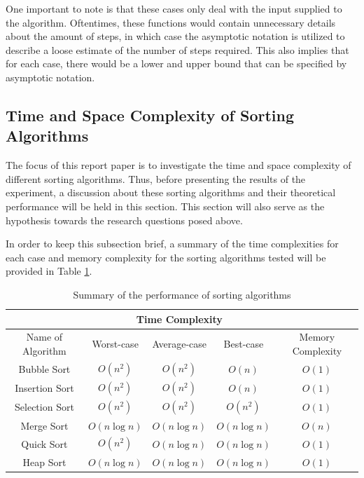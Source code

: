 \documentclass{report}
\begin{document}
One important to note is that these cases only deal with the input supplied to the algorithm. Oftentimes, these functions would contain unnecessary details about the amount of steps, in which case the asymptotic notation is utilized to describe a loose estimate of the number of steps required. This also implies that for each case, there would be a lower and upper bound that can be specified by asymptotic notation.

\subsection{Time and Space Complexity of Sorting Algorithms}
The focus of this report paper is to investigate the time and space complexity of different sorting algorithms. Thus, before presenting the results of the experiment, a discussion about these sorting algorithms and their theoretical performance will be held in this section. This section will also serve as the hypothesis towards the research questions posed above.

In order to keep this subsection brief, a summary of the time complexities for each case and memory complexity for the sorting algorithms tested will be provided in Table \ref{sumSort}.
\begin{table}[h]
	\centering
	\begin{tabular}{@{}ccccc@{}}
		\toprule
		\multicolumn{1}{|c}{\cellcolor[HTML]{000000}} & \multicolumn{3}{c|}{Time Complexity}          & \multicolumn{1}{c|}{\cellcolor[HTML]{000000}} \\ \midrule
		\multicolumn{1}{c|}{Name of Algorithm}        & Worst-case    & Average-case  & Best-case     & Memory Complexity                             \\ \midrule
		\multicolumn{1}{c|}{Bubble Sort}              & $O(n^2)$      & $O(n^2)$      & $O(n)$        & $O(1)$                                        \\
		\multicolumn{1}{c|}{Insertion Sort}           & $O(n^2)$      & $O(n^2)$      & $O(n)$        & $O(1)$                                        \\
		\multicolumn{1}{c|}{Selection Sort}           & $O(n^2)$      & $O(n^2)$      & $O(n^2)$      & $O(1)$                                        \\
		\multicolumn{1}{c|}{Merge Sort}               & $O(n \log n)$ & $O(n \log n)$ & $O(n \log n)$ & $O(n)$                                        \\
		\multicolumn{1}{c|}{Quick Sort}               & $O(n^2)$      & $O(n \log n)$ & $O(n \log n)$ & $O(1)$                                        \\
		\multicolumn{1}{c|}{Heap Sort}                & $O(n \log n)$ & $O(n \log n)$ & $O(n \log n)$ & $O(1)$                                        \\ \bottomrule
	\end{tabular}
	\caption{Summary of the performance of sorting algorithms \autocite{cormenIntroductionAlgorithms2022}}
	\label{sumSort}
\end{table}
\end{document}
